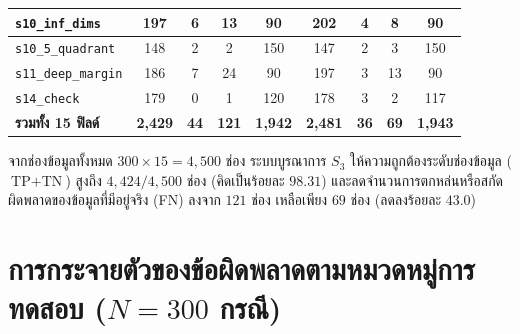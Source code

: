 \begin{table}[H]
\begin{tabular}{|l|c|c|c|c||c|c|c|c|}
\hline
\texttt{s10\_inf\_dims} & 197 & 6 & 13 & 90 & 202 & 4 & 8 & 90 \\
\hline
\texttt{s10\_5\_quadrant} & 148 & 2 & 2 & 150 & 147 & 2 & 3 & 150 \\
\hline
\texttt{s11\_deep\_margin} & 186 & 7 & 24 & 90 & 197 & 3 & 13 & 90 \\
\hline
\texttt{s14\_check} & 179 & 0 & 1 & 120 & 178 & 3 & 2 & 117 \\
\hline
\textbf{รวมทั้ง 15 ฟิลด์} & \textbf{2,429} & \textbf{44} & \textbf{121} & \textbf{1,942} & \textbf{2,481} & \textbf{36} & \textbf{69} & \textbf{1,943} \\
\hline
\end{tabular}
\end{table}

\noindent จากช่องข้อมูลทั้งหมด $300 \times 15 = 4{,}500$ ช่อง ระบบบูรณาการ $S_3$ ให้ความถูกต้องระดับช่องข้อมูล ($\text{TP} + \text{TN}$) สูงถึง $4{,}424 / 4{,}500$ ช่อง (คิดเป็นร้อยละ $98.31$) และลดจำนวนการตกหล่นหรือสกัดผิดพลาดของข้อมูลที่มีอยู่จริง (FN) ลงจาก $121$ ช่อง เหลือเพียง $69$ ช่อง (ลดลงร้อยละ $43.0$)

\section*{การกระจายตัวของข้อผิดพลาดตามหมวดหมู่การทดสอบ ($N = 300$ กรณี)}

